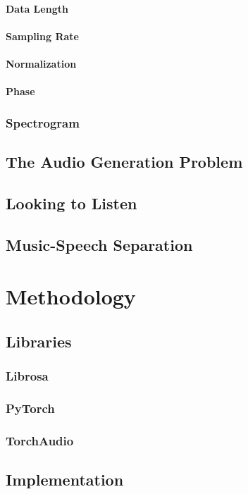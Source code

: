 \documentclass{book}
\begin{document}
\subsection{Data Length}
\subsection{Sampling Rate}
\subsection{Normalization}
\subsection{Phase}
\section{Spectrogram}
\chapter{The Audio Generation Problem}
\chapter{Looking to Listen}
\chapter{Music-Speech Separation}

\part{Methodology}
\chapter{Libraries}
\section{Librosa}
\section{PyTorch}
\section{TorchAudio}
\chapter{Implementation}
\end{document}

